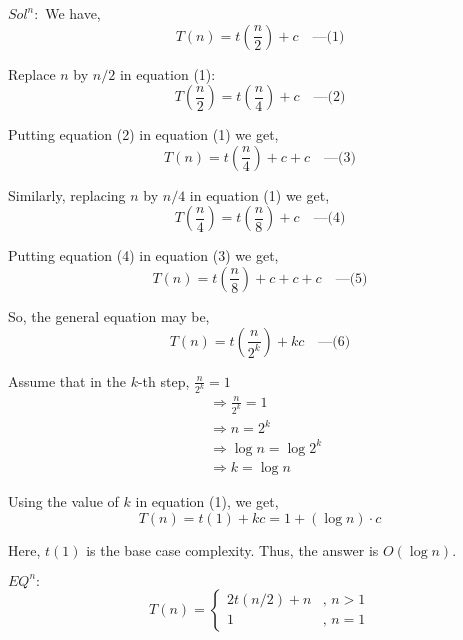 \documentclass{article}
\begin{document}
$Sol^n:$
We have,
\begin{equation}
    T(n) = t\left(\frac{n}{2}\right) + c \quad \text{---(1)}
\end{equation}

Replace \( n \) by \( n/2 \) in equation (1):
\begin{equation}
    T\left(\frac{n}{2}\right) = t\left(\frac{n}{4}\right) + c \quad \text{---(2)}
\end{equation}

Putting equation (2) in equation (1) we get,
\begin{equation}
    T(n) = t\left(\frac{n}{4}\right) + c + c \quad \text{---(3)}
\end{equation}

Similarly, replacing \( n \) by \( n/4 \) in equation (1) we get,
\begin{equation}
    T\left(\frac{n}{4}\right) = t\left(\frac{n}{8}\right) + c \quad \text{---(4)}
\end{equation}

Putting equation (4) in equation (3) we get,
\begin{equation}
    T(n) = t\left(\frac{n}{8}\right) + c + c + c \quad \text{---(5)}
\end{equation}

So, the general equation may be,
\begin{equation}
    T(n) = t\left(\frac{n}{2^k}\right) + kc \quad \text{---(6)}
\end{equation}

Assume that in the \( k \)-th step, \( \frac{n}{2^k} = 1 \)
\begin{align*}
    & \Rightarrow \frac{n}{2^k} = 1 \\
    & \Rightarrow n = 2^k \\
    & \Rightarrow \log n = \log 2^k \\
    & \Rightarrow k = \log n
\end{align*}

Using the value of \( k \) in equation (1), we get,
\begin{equation}
    T(n) = t(1) + kc = 1 + (\log n) \cdot c
\end{equation}

Here, \( t(1) \) is the base case complexity. Thus, the answer is \( O(\log n) \).

\hrulefill
\newpage

$EQ^n:$
\[
    T(n) = 
    \begin{cases}
        2t(n/2) + n & \text{, } n > 1 \\
        1 & \text{, } n = 1
    \end{cases}
\]
\end{document}
